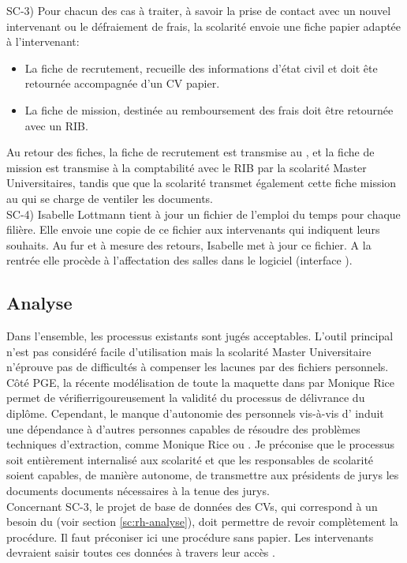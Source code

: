 \documentclass{book}
\begin{document}
SC-3) Pour chacun des cas à traiter, à savoir la prise de contact
avec un nouvel intervenant ou le défraiement de frais,
la scolarité envoie une fiche papier adaptée à l'intervenant:
\begin{itemize}
\item La fiche de recrutement, recueille des informations d'état 
civil et doit ête retournée accompagnée d'un CV papier. 
\item 
La fiche de mission, destinée au remboursement des frais doit 
être retournée avec un RIB. 
\end{itemize}
Au retour des fiches, la fiche de recrutement est transmise 
au \srh, et la fiche de mission est transmise à la comptabilité
avec le RIB par la scolarité Master Universitaires, tandis que
que la scolarité transmet également cette fiche mission au \srh
qui se charge de ventiler les documents.\\

SC-4) Isabelle Lottmann tient à jour un fichier  de 
l'emploi du temps pour chaque filière. Elle envoie une copie de ce 
fichier aux intervenants qui indiquent leurs souhaits. Au fur et
à mesure des retours, Isabelle met à jour ce fichier. A la rentrée
elle procède à l'affectation des salles dans le logiciel 
(interface ).


\subsection{Analyse}

Dans l'ensemble, les processus existants sont jugés acceptables.
L'outil principal  n'est pas considéré facile 
d'utilisation mais la scolarité Master Universitaire n'éprouve
pas de difficultés à compenser les lacunes par des fichiers 
 personnels. Côté PGE, la récente modélisation 
de toute la maquette dans  par Monique Rice permet 
de vérifierrigoureusement la validité du processus de délivrance 
du diplôme.
Cependant, le manque d'autonomie des personnels vis-à-vis
d' induit une dépendance à d'autres personnes
capables de résoudre des problèmes techniques d'extraction,
comme Monique Rice ou \CK. Je préconise que le processus
soit entièrement internalisé aux scolarité et que les 
responsables de scolarité soient capables, de manière autonome,
de transmettre aux présidents de jurys les documents documents 
nécessaires à la tenue des jurys.\\

Concernant SC-3, le projet de base de données des CVs, qui 
correspond à un besoin du \srh (voir section \ref{sc:rh-analyse}),
doit permettre de revoir complètement la procédure. Il faut
préconiser ici une procédure sans papier. Les intervenants
devraient saisir toutes ces données à travers leur accès 
.
\end{document}
